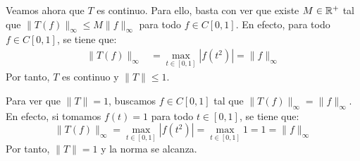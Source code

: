 \begin{ejercicio}
\begin{enumerate}
    Veamos ahora que $T$ es continuo. Para ello, basta con ver que existe $M \in \mathbb{R}^+$ tal que $\|T(f)\|_\infty \leq M \|f\|_\infty$ para todo $f \in C\left[0, 1\right]$. En efecto, para todo $f \in C\left[0, 1\right]$, se tiene que:
    \begin{align*}
        \|T(f)\|_\infty &= \max_{t \in \left[0, 1\right]} |f(t^2)| = \|f\|_\infty
    \end{align*}
    Por tanto, $T$ es continuo y $\|T\|\leq 1$.

    Para ver que $\|T\| = 1$, buscamos $f \in C\left[0, 1\right]$ tal que $\|T(f)\|_\infty = \|f\|_\infty$. En efecto, si tomamos $f(t) = 1$ para todo $t \in \left[0, 1\right]$, se tiene que:
    \begin{equation*}
        \|T(f)\|_\infty = \max_{t \in \left[0, 1\right]} |f(t^2)| = \max_{t \in \left[0, 1\right]} 1 = 1 = \|f\|_\infty
    \end{equation*}
    Por tanto, $\|T\| = 1$ y la norma se alcanza.
\end{enumerate}
\end{ejercicio}

